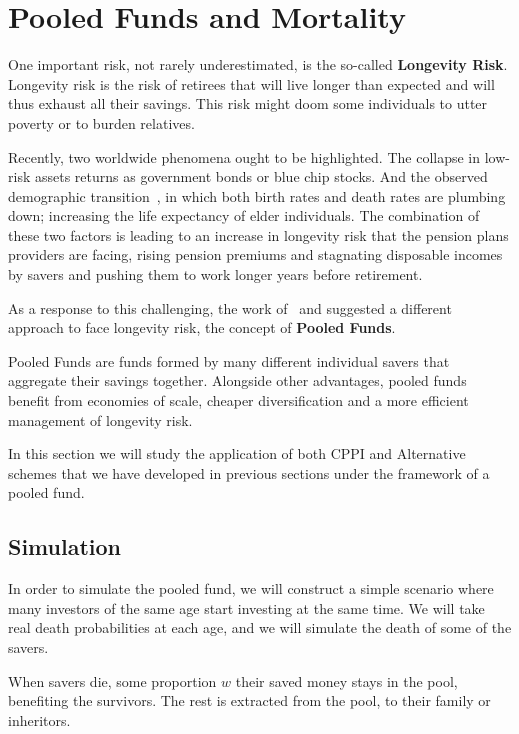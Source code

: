 \section{Pooled Funds and Mortality}

One important risk, not rarely underestimated, is the so-called \textbf{Longevity Risk}. Longevity risk is the risk of retirees that will live longer than expected and will thus exhaust all their savings. This risk might doom some individuals to utter poverty or to burden relatives.

Recently, two worldwide phenomena ought to be highlighted. The collapse in low-risk assets returns as government bonds or blue chip stocks. And the observed demographic transition~\textcite{b:handbook-natural, a:bongaarts-human}, in which both birth rates and death rates are plumbing down; increasing the life expectancy of elder individuals. The combination of these two factors is leading to an increase in longevity risk that the pension plans providers are facing, rising pension premiums and stagnating disposable incomes by savers and pushing them to work longer years before retirement.

As a response to this challenging, the work of~\cite{a:donnelly-transparency} and \cite{a:brautigam-pool} suggested a different approach to face longevity risk,  the concept of \textbf{Pooled Funds}. 

Pooled Funds are funds formed by many different individual savers that aggregate their savings together. Alongside other advantages, pooled funds benefit from economies of scale, cheaper diversification and a more efficient management of longevity risk.

In this section we will study the application of both CPPI and Alternative schemes that we have developed in previous sections under the framework of a pooled fund. 


\subsection{Simulation}

In order to simulate the pooled fund, we will construct a simple scenario where many investors of the same age start investing at the same time. We will take real death probabilities at each age, and we will simulate the death of some of the savers. 

When savers die, some proportion $w$ their saved money stays in the pool, benefiting the survivors. The rest is extracted from the pool, to their family or inheritors.

